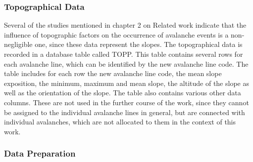 \documentclass[../masterarbeit.tex]{subfiles}
\begin{document}
\subsubsection{Topographical Data}
Several of the studies mentioned in chapter 2 on Related work indicate that the influence of topographic factors on the occurrence of avalanche events is a non-negligible one, since these data represent the slopes.\autocite[]{Tiwari:2021} \autocite[]{Bahram:2019} 
The topographical data is recorded in a database table called TOPP. This table contains several rows for each avalanche line, which can be identified by the new avalanche line code. The table includes for each row the new avalanche line code, the mean slope exposition, the minimum, maximum and mean slope, the altitude of the slope as well as the orientation of the slope. The table also contains various other data columns. These are not used in the further course of the work, since they cannot be assigned to the individual avalanche lines in general, but are connected with individual avalanches, which are not allocated to them in the context of this work. 




\subsubsection{Data Preparation}
 
\end{document}
